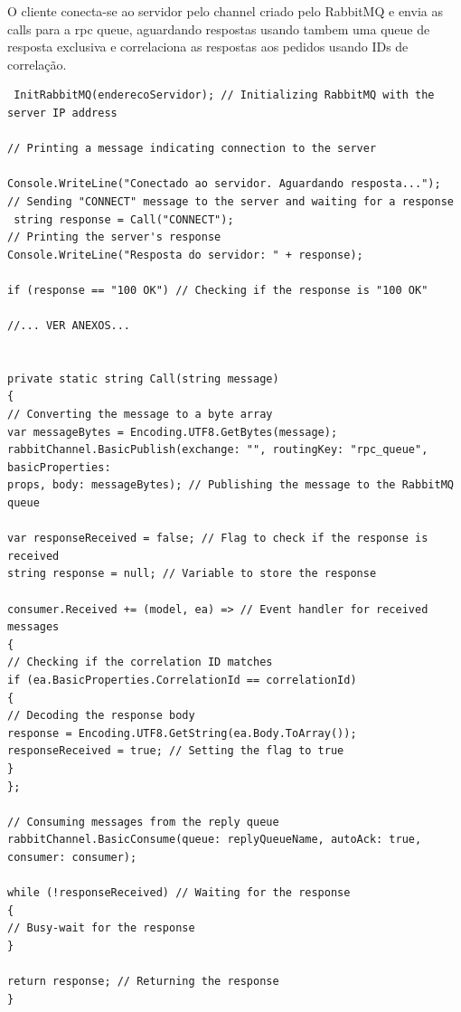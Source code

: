 \documentclass[12pt]{article}
\begin{document}
\noindent O cliente conecta-se ao servidor pelo channel criado pelo RabbitMQ e envia as calls para a rpc queue, aguardando respostas usando tambem uma queue de resposta exclusiva e correlaciona as respostas aos pedidos usando IDs de correlação.\\
\begin{verbatim}
 InitRabbitMQ(enderecoServidor); // Initializing RabbitMQ with the server IP address

// Printing a message indicating connection to the server

Console.WriteLine("Conectado ao servidor. Aguardando resposta..."); 
// Sending "CONNECT" message to the server and waiting for a response
 string response = Call("CONNECT"); 
// Printing the server's response
Console.WriteLine("Resposta do servidor: " + response); 

if (response == "100 OK") // Checking if the response is "100 OK"

//... VER ANEXOS...


private static string Call(string message)
{
// Converting the message to a byte array
var messageBytes = Encoding.UTF8.GetBytes(message); 
rabbitChannel.BasicPublish(exchange: "", routingKey: "rpc_queue", basicProperties: 
props, body: messageBytes); // Publishing the message to the RabbitMQ queue

var responseReceived = false; // Flag to check if the response is received
string response = null; // Variable to store the response

consumer.Received += (model, ea) => // Event handler for received messages
{
// Checking if the correlation ID matches
if (ea.BasicProperties.CorrelationId == correlationId) 
{
// Decoding the response body
response = Encoding.UTF8.GetString(ea.Body.ToArray()); 
responseReceived = true; // Setting the flag to true
}
};

// Consuming messages from the reply queue
rabbitChannel.BasicConsume(queue: replyQueueName, autoAck: true, consumer: consumer); 

while (!responseReceived) // Waiting for the response
{
// Busy-wait for the response
}

return response; // Returning the response
}

\end{verbatim}
\end{document}
